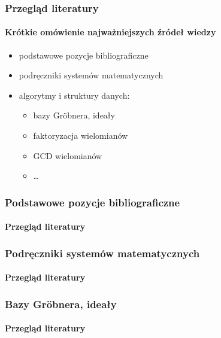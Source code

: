 \documentclass{beamer}
\begin{document}
\begin{frame}
    \frametitle{Przegląd literatury}
    \framesubtitle{Krótkie omówienie najważniejszych źródeł wiedzy}

    \begin{itemize}
        \item podstawowe pozycje bibliograficzne
        \pause
        \item podręczniki systemów matematycznych
        \pause
        \item algorytmy i struktury danych:
            \begin{itemize}
                \item bazy Gr\"{o}bnera, ideały
                \item faktoryzacja wielomianów
                \item GCD wielomianów
                \item \ldots
            \end{itemize}
    \end{itemize}
\end{frame}

\begin{frame}[allowframebreaks]
    \frametitle{Podstawowe pozycje bibliograficzne}
    \framesubtitle{Przegląd literatury}


\end{frame}

\begin{frame}[allowframebreaks]
    \frametitle{Podręczniki systemów matematycznych}
    \framesubtitle{Przegląd literatury}


\end{frame}

\begin{frame}[allowframebreaks]
    \frametitle{Bazy Gr\"{o}bnera, ideały}
    \framesubtitle{Przegląd literatury}



\end{frame}
\end{document}
